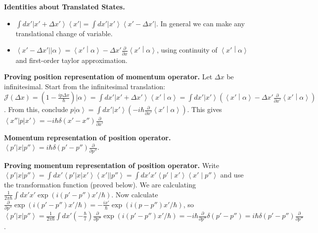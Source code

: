 \textbf{Identities about Translated States.}
\begin{itemize}
	\item $\int dx' \left| x' + \Delta x' \right\rangle \left\langle x' \right| = \int dx' \left| x' \right\rangle \left\langle x' - \Delta x' \right| $. In general we can make any translational change of variable.
	\item $\left\langle x' - \Delta x' \right| \left| \alpha \right\rangle = \left\langle x' \middle| \alpha \right\rangle - \Delta x' \frac{\partial }{\partial x} \left\langle x' \middle| \alpha \right\rangle $, using continuity of $\left\langle x' \middle| \alpha \right\rangle $ and first-order taylor approximation.
\end{itemize}

\textbf{Proving position representation of momentum operator.} 
Let $\Delta x$ be infinitesimal. Start from the infinitesimal translation: $\mathcal{J}(\Delta x) = \left( 1 - \frac{i p \Delta x}{\hbar} \right) \left| \alpha \right\rangle = \int dx' \left| x' + \Delta x' \right\rangle \left\langle x' \middle| \alpha \right\rangle = \int dx' \left| x' \right\rangle \left( \left\langle x' \middle| \alpha \right\rangle  - \Delta x' \frac{\partial }{\partial x'} \left\langle x' \middle| \alpha \right\rangle  \right)  $. From this, conclude $p \left| \alpha \right\rangle = \int dx' \left| x' \right\rangle \left( - i \hbar \frac{\partial }{\partial x'} \left\langle x' \middle| \alpha \right\rangle  \right) $. This gives $\left\langle x'' \right| p \left| x' \right\rangle = - i \hbar \delta(x' - x'') \frac{\partial }{\partial x'} $

\textbf{Momentum representation of position operator.} \\$\left\langle p' \right| x \left| p'' \right\rangle = i \hbar \delta(p' - p'') \frac{\partial }{\partial p''} $.

\textbf{Proving momentum representation of position operator.} Write $\left\langle p' \right| x \left| p'' \right\rangle = \int dx' \left\langle p' \right| x \left| x' \right\rangle \left\langle x' \right| \left| p'' \right\rangle = \int dx' x' \left\langle p' \middle| x' \right\rangle \left\langle x' \middle| p'' \right\rangle $ and use the transformation function (proved below). We are calculating $\frac{1}{2 \pi \hbar} \int dx' x' \exp\left( i (p' - p'') x' / \hbar \right) $. 
Now calculate $\frac{\partial }{\partial p''} \exp(i (p' - p'') x' / \hbar) = -\frac{i x'}{\hbar} \exp(i (p - p'') x' / \hbar)$,
so $\left\langle p' \right| x \left| p'' \right\rangle = \frac{1}{2 \pi \hbar} \int  dx' (- \frac{\hbar}{i}) \frac{\partial }{\partial p''}  \exp(i (p' - p'') x'/\hbar) =  - i \hbar \frac{\partial }{\partial p''} \delta(p' - p'') = i \hbar \delta(p' - p'') \frac{\partial }{\partial p''}  $.

